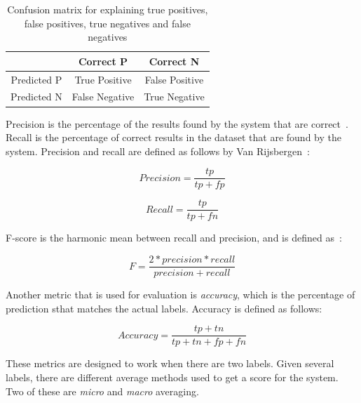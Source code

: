 \begin{table}[!ht]
    \begin{center}
        \begin{tabular}{c c c}
            & Correct P & Correct N \\
            \toprule
            Predicted P & True Positive & False Positive \\
            Predicted N & False Negative & True Negative \\
        \end{tabular}
    \end{center}
    \caption{Confusion matrix for explaining true positives, false positives, true negatives and false negatives}\label{tab:conf-matr}
\end{table}

Precision is the percentage of the results found by the system that are correct~\cite{tjong2003introduction}.
Recall is the percentage of correct results in the dataset that are found by the system.
Precision and recall are defined as follows by Van Rijsbergen~\cite{rijsenbergen1979information}:

\begin{equation}
    Precision = \frac{tp}{tp+fp}
\end{equation}

\begin{equation}
    Recall = \frac{tp}{tp+fn}
\end{equation}

F-score is the harmonic mean between recall and precision, and is defined as~\cite{tjong2003introduction}:

\begin{equation}
    F = \frac{2*precision*recall}{precision+recall}
\end{equation}

Another metric that is used for evaluation is \textit{accuracy}, which is the percentage of prediction sthat matches the actual labels.
Accuracy is defined as follows:

\begin{equation}
    Accuracy = \frac{tp+tn}{tp+tn+fp+fn}
\end{equation}

These metrics are designed to work when there are two labels.
Given several labels, there are different average methods used to get a score for the system.
Two of these are \textit{micro} and \textit{macro} averaging.


